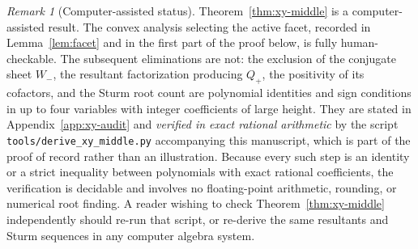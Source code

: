 \documentclass[11pt,a4paper]{article}
\theoremstyle{remark}
\newtheorem{remark}{Remark}
\begin{document}
\begin{remark}[Computer-assisted status]
\label{rem:cas}
Theorem~\ref{thm:xy-middle} is a computer-assisted result.  The convex
analysis selecting the active facet, recorded in Lemma~\ref{lem:facet} and in
the first part of the proof below, is fully human-checkable.  The subsequent
eliminations are not: the exclusion of the conjugate sheet $W_-$, the
resultant factorization producing $Q_+$, the positivity of its cofactors, and
the Sturm root count are polynomial identities and sign conditions in up to
four variables with integer coefficients of large height.  They are stated in
Appendix~\ref{app:xy-audit} and \emph{verified in exact rational arithmetic}
by the script \texttt{tools/derive\_xy\_middle.py} accompanying this
manuscript, which is part of the proof of record rather than an illustration.
Because every such step is an identity or a strict inequality between
polynomials with exact rational coefficients, the verification is decidable
and involves no floating-point arithmetic, rounding, or numerical root
finding.  A reader wishing to check Theorem~\ref{thm:xy-middle} independently
should re-run that script, or re-derive the same resultants and Sturm
sequences in any computer algebra system.
\end{remark}
\end{document}

